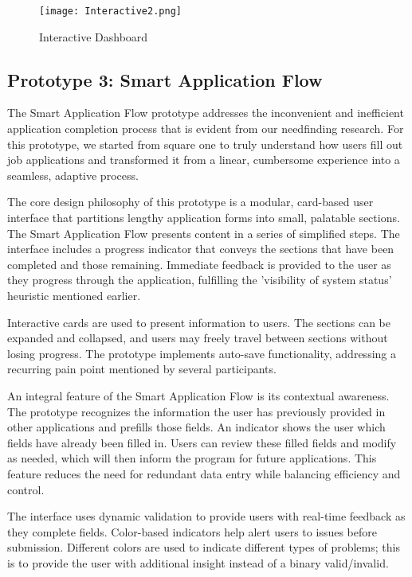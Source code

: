 \documentclass[
	letterpaper, %
]{jdf}
\begin{document}
\begin{figure}
    \centering
    \texttt{[image: Interactive2.png]}
    \caption{Interactive Dashboard}
    \label{fig:enter-label}
\end{figure}
\newpage
\subsection{Prototype 3: Smart Application Flow}

The Smart Application Flow prototype addresses the inconvenient and inefficient application completion process that is evident from our needfinding research. For this prototype, we started from square one to truly understand how users fill out job applications and transformed it from a linear, cumbersome experience into a seamless, adaptive process.

The core design philosophy of this prototype is a modular, card-based user interface that partitions lengthy application forms into small, palatable sections. The Smart Application Flow presents content in a series of simplified steps. The interface includes a progress indicator that conveys the sections that have been completed and those remaining. Immediate feedback is provided to the user as they progress through the application, fulfilling the 'visibility of system status' heuristic mentioned earlier.

Interactive cards are used to present information to users. The sections can be expanded and collapsed, and users may freely travel between sections without losing progress. The prototype implements auto-save functionality, addressing a recurring pain point mentioned by several participants.

An integral feature of the Smart Application Flow is its contextual awareness. The prototype recognizes the information the user has previously provided in other applications and prefills those fields. An indicator shows the user which fields have already been filled in. Users can review these filled fields and modify as needed, which will then inform the program for future applications. This feature reduces the need for redundant data entry while balancing efficiency and control.

The interface uses dynamic validation to provide users with real-time feedback as they complete fields. Color-based indicators help alert users to issues before submission. Different colors are used to indicate different types of problems; this is to provide the user with additional insight instead of a binary valid/invalid.
\end{document}
